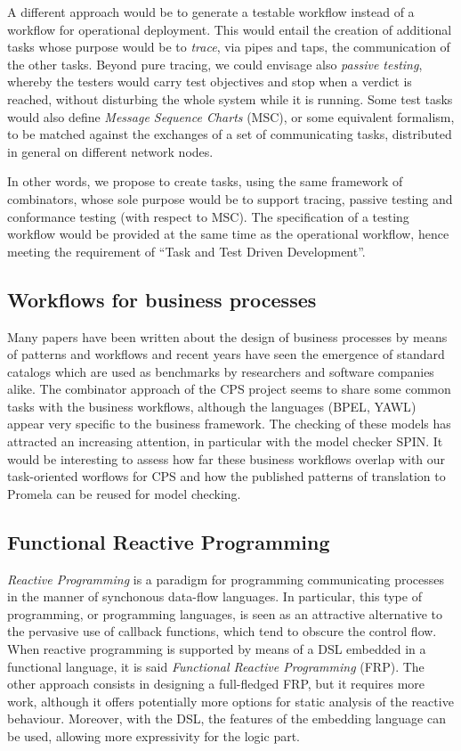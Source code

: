 \documentclass[a4paper,11pt,twoside]{article}
\newcommand\SPIN{\textsf{SPIN}\xspace}
\newcommand\Promela{\textsf{Promela}\xspace}
\newcommand\BPEL{\textsf{BPEL}\xspace}
\newcommand\YAWL{\textsf{YAWL}\xspace}
\begin{document}
A different approach would be to generate a testable workflow instead
of a workflow for operational deployment. This would entail the
creation of additional tasks whose purpose would be to \emph{trace},
via pipes and taps, the communication of the other tasks. Beyond pure
tracing, we could envisage also \emph{passive testing}, whereby the
testers would carry test objectives and stop when a verdict is
reached, without disturbing the whole system while it is running. Some
test tasks would also define \emph{Message Sequence Charts} (MSC), or
some equivalent formalism, to be matched against the exchanges of a
set of communicating tasks, distributed in general on different
network nodes.

In other words, we propose to create tasks, using the same framework
of combinators, whose sole purpose would be to support tracing,
passive testing and conformance testing (with respect to MSC). The
specification of a testing workflow would be provided at the same time
as the operational workflow, hence meeting the requirement of ``Task
and Test Driven Development''.

\subsection{Workflows for business processes}

Many papers have been written about the design of business processes
by means of patterns and workflows and recent years have seen the
emergence of standard catalogs which are used as benchmarks by
researchers and software companies alike. The combinator approach of
the CPS project seems to share some common tasks with the business
workflows, although the languages (\BPEL, \YAWL) appear very specific
to the business framework. The checking of these models has attracted
an increasing attention, in particular with the model checker
\SPIN. It would be interesting to assess how far these business
workflows overlap with our task-oriented worflows for CPS and how the
published patterns of translation to \Promela can be reused for model
checking.

\subsection{Functional Reactive Programming}

\emph{Reactive Programming} is a paradigm for programming
communicating processes in the manner of synchonous data\hyp{}flow
languages. In particular, this type of programming, or programming
languages, is seen as an attractive alternative to the pervasive use
of callback functions, which tend to obscure the control flow. When
reactive programming is supported by means of a DSL embedded in a
functional language, it is said \emph{Functional Reactive Programming}
(FRP). The other approach consists in designing a full\hyp{}fledged
FRP, but it requires more work, although it offers potentially more
options for static analysis of the reactive behaviour. Moreover, with
the DSL, the features of the embedding language can be used, allowing
more expressivity for the logic part.
\end{document}
